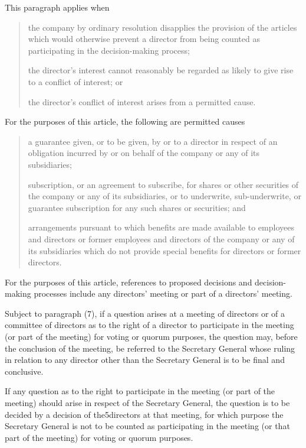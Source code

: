\documentclass[letterpaper,10pt,openany,oneside,english]{sphinxmanual}
\begin{document}
 This paragraph applies when
\begin{quote}

 the company by ordinary resolution disapplies the provision of the articles which would otherwise prevent a director from being counted as participating in the decision-making process;

 the director’s interest cannot reasonably be regarded as likely to give rise to a conflict of interest; or

 the director’s conflict of interest arises from a permitted cause.
\end{quote}

 For the purposes of this article, the following are permitted causes
\begin{quote}

 a guarantee given, or to be given, by or to a director in respect of an obligation incurred by or on behalf of the company or any of its subsidiaries;

 subscription, or an agreement to subscribe, for shares or other securities of the company or any of its subsidiaries, or to underwrite, sub-underwrite, or guarantee subscription for any such shares or securities; and

 arrangements pursuant to which benefits are made available to employees and directors or former employees and directors of the company or any of its subsidiaries which do not provide special benefits for directors or former directors.
\end{quote}

 For the purposes of this article, references to proposed decisions and decision-making processes include any directors’ meeting or part of a directors’ meeting.

 Subject to paragraph (7), if a question arises at a meeting of directors or of a committee of directors as to the right of a director to participate in the meeting (or part of the meeting) for voting or quorum purposes, the question may, before the conclusion of the meeting, be referred to the Secretary General whose ruling in relation to any director other than the Secretary General is to be final and conclusive.

 If any question as to the right to participate in the meeting (or part of the meeting) should arise in respect of the Secretary General, the question is to be decided by a decision of the5directors at that meeting, for which purpose the Secretary General is not to be counted as participating in the meeting (or that part of the meeting) for voting or quorum purposes.
\end{document}
